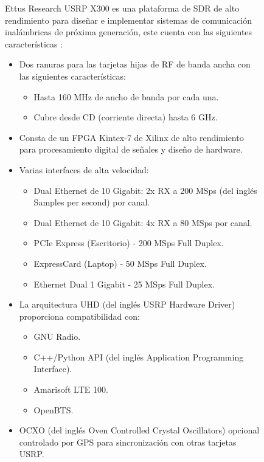 \documentclass[12pt]{difu100cia} %
\begin{document}
\begin{figure}[!ht]
Ettus Research USRP X300 es una plataforma de SDR de alto rendimiento para diseñar e implementar sistemas de comunicación inalámbricas de próxima generación, este cuenta con las siguientes características \cite{ettusresearch}:

\begin{itemize}
    \item Dos ranuras para las tarjetas hijas de RF de banda ancha con las siguientes características:
    \begin{itemize}
        \item Hasta 160 MHz de ancho de banda por cada una. 
        \item Cubre desde CD (corriente directa) hasta 6 GHz. 
    \end{itemize}
    \item Consta de un FPGA Kintex-7 de Xilinx de alto rendimiento para procesamiento digital de señales y diseño de hardware.
    \item Varias interfaces de alta velocidad: 
    
    \begin{itemize}
        \item Dual Ethernet de 10 Gigabit:  2x RX a 200 MSps (del inglés Samples per second) por canal.
        \item Dual Ethernet de 10 Gigabit: 4x RX a 80 MSps por canal.
        \item PCIe Express (Escritorio) - 200 MSps Full Duplex.
        \item ExpressCard (Laptop) - 50 MSps Full Duplex.
        \item Ethernet Dual 1 Gigabit - 25 MSps Full Duplex.
    \end{itemize}
    \item La arquitectura UHD (del inglés USRP Hardware Driver) proporciona compatibilidad con:
    \begin{itemize}
        \item GNU Radio.
        \item C++/Python API (del inglés Application Programming Interface).
        \item Amarisoft LTE 100.
        \item OpenBTS.
    \end{itemize}
    
    \item OCXO (del inglés Oven Controlled Crystal Oscillators) opcional controlado por GPS para sincronización con otras tarjetas USRP.
\end{itemize}


\end{figure}
\end{document}
